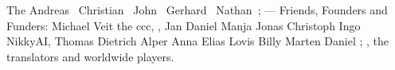 \raggedright

\noindent The 
Andreas~
Chris\-tian~
John~
Gerhard~
Nathan~;
---
\noindent Friends, Founders and Funders: 
Michael 
Veit 
the ccc,
, 
Jan 
Daniel 
Manja 
Jonas 
Christoph 
Ingo 
NikkyAI,
Thomas 
Dietrich 
Alper 
Anna 
Elias 
Lovis 
Billy 
Marten 
Daniel ;
,
\noindent the translators
and 
worldwide players.

